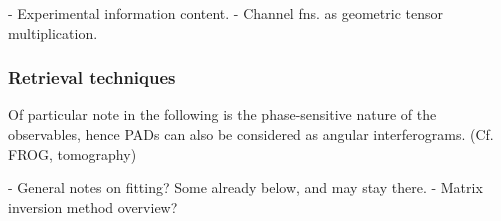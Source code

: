 







- Experimental information content.
- Channel fns. as geometric tensor multiplication.


\subsubsection{Retrieval techniques}

Of particular note in the following is the phase-sensitive nature of the observables, hence PADs can also be considered as angular interferograms. (Cf. FROG, tomography)

- General notes on fitting? Some already below, and may stay there.
- Matrix inversion method overview?

